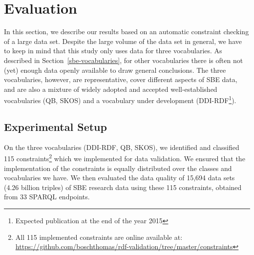 \documentclass{llncs}
\newcommand{\ke}[1]{\todo[size=\small, color=orange!40]{\textbf{Kai:} #1}}
\begin{document}
\section{Evaluation}

In this section, we describe our results based on an automatic constraint checking of a large data set. Despite the large volume of the data set in general, we have to keep in mind that this study only uses data for three vocabularies. As described in Section~\ref{sbe-vocabularies}, for other vocabularies there is often not (yet) enough data openly available to draw general conclusions. The three vocabularies, however, are representative, cover different aspects of SBE data, and are also a mixture of widely adopted and accepted well-established vocabularies (QB, SKOS) and a vocabulary under development (DDI-RDF\footnote{Expected publication at the end of the year 2015}).

\subsection{Experimental Setup}
\label{implementation}


On the three vocabularies (DDI-RDF, QB, SKOS), we identified and classified 115 constraints\footnote{All 115 implemented constraints are online available at: \url{https://github.com/boschthomas/rdf-validation/tree/master/constraints}} which we implemented for data validation. We ensured that the implementation of the constraints is equally distributed over the classes and vocabularies we have. We then evaluated the data quality of 15,694 data sets (4.26 billion triples) of SBE research data using these 115 constraints, obtained from 33 SPARQL endpoints.

\end{document}

